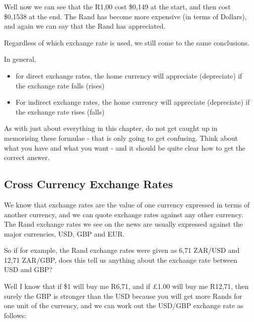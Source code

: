 \documentclass[10pt,a4paper,titlepage,twoside,openright]{report}
\begin{document}
Well now we can see that the R1,00 cost \$0,149 at the start, and then cost \$0,1538 at the end. The Rand has become more expensive (in terms of Dollars), and again we can say that the Rand has appreciated.

Regardless of which exchange rate is used, we still come to the same conclusions.

In general,
\begin{itemize}[topsep=0ex, partopsep=\parskip,itemsep=\parskip]
\item{for direct exchange rates, the home currency will appreciate (depreciate) if the exchange rate falls (rises)}
\item{For indirect exchange rates, the home currency will appreciate (depreciate) if the exchange rate rises (falls)}
\end{itemize}

As with just about everything in this chapter, do not get caught up in memorising these formulae - that is only going to get confusing. Think about what you have and what you want - and it should be quite clear how to get the correct answer.


\subsection{Cross Currency Exchange Rates}
We know that exchange rates are the value of one currency expressed in terms of another currency, and we can quote exchange rates against any other currency. The Rand exchange rates we see on the news are usually expressed against the major currencies, USD, GBP and EUR.

So if for example, the Rand exchange rates were given as 6,71 ZAR/USD and 12,71 ZAR/GBP, does this tell us anything about the exchange rate between USD and GBP?

Well I know that if \$1 will buy me R6,71, and if \pounds 1.00 will buy me R12,71, then surely the GBP is stronger than the USD because you will get more Rands for one unit of the currency, and we can work out the USD/GBP exchange rate as follows:
\end{document}
